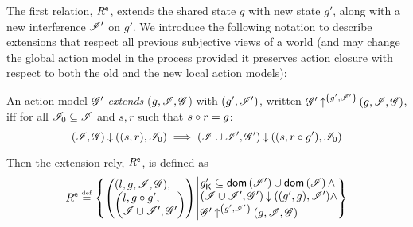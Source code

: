 The first relation, $R^{\textsf{e}}$, extends the shared state $g$ with new
state $g'$, along with a new interference $\mathscr{I}'$ on $g'$. We introduce
the following notation to describe extensions that respect all
previous subjective views of a world (and may change the global action
model in the process provided it preserves action closure with respect
to both the old and the new local action models):
\begin{definition}\label{def:amodExtension}
An action model $\mathscr{G}'$ \emph{extends} ($g, \mathscr{I}, \mathscr{G}$) with
$(g', \mathscr{I}')$, written
$\mathscr{G}' \mathbin{\uparrow}^{\left(g', \mathscr{I}'\right)} (g, \mathscr{I}, \mathscr{G})$, iff for all
$\mathscr{I}_0 \subseteq \mathscr{I}$ and $s, r$ such that $s \circ r = g$:
\[
(\mathscr{I}, \mathscr{G}) \mathbin{\downarrow} ((s, r), \mathscr{I}_0) \implies (\mathscr{I} \cup \mathscr{I}', \mathscr{G}') \mathbin{\downarrow} ((s, r\circ g'), \mathscr{I}_0)
\]
\end{definition}
Then the extension rely, $R^{\textsf{e}}$, is defined as
\[
  \extendR \eqdef
  \left\{
  \begin{array}{@{} l @{\hspace*{2pt}} | @{\hspace*{2pt}} r @{}}
    \left(
    \begin{array}{@{} l @{}}
      (l , g, \lmod, \gmod),\\
      \left(
      \begin{array}{@{} l @{}}
	l,
	g \composeL g',\\
	\lmod \cup \lmod', \gmod'
      \end{array}
      \right)
    \end{array}
    \right)
    &
    \begin{array}{@{} l @{}}
      \capPart{g'} \subseteq \dom{\lmod'} \cup \dom{\lmod} \land \\
      \extendsAM{\lmod \cup \lmod', \gmod'}{g'}{g}{\lmod'} \land \\
      \expandsAM{\gmod'}{g'}{\lmod'}{g}{\lmod}{\gmod}
    \end{array}
  \end{array}
  \right\}
\]


